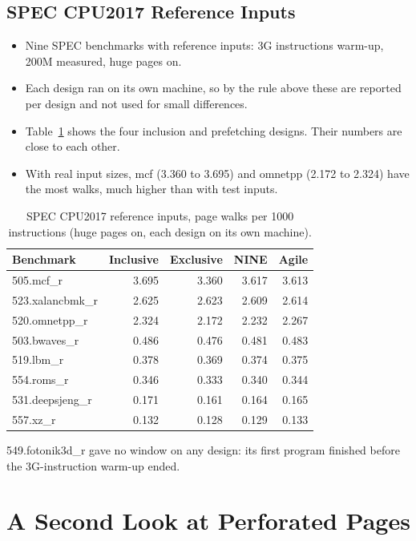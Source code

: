 \subsection{SPEC CPU2017 Reference Inputs}
\begin{itemize}
    \item Nine SPEC benchmarks with reference inputs: 3G instructions warm-up, 200M measured, huge pages on.
    \item Each design ran on its own machine, so by the rule above these are reported per design and not used for small differences.
    \item Table~\ref{tab:ref} shows the four inclusion and prefetching designs. Their numbers are close to each other.
    \item With real input sizes, mcf (3.360 to 3.695) and omnetpp (2.172 to 2.324) have the most walks, much higher than with test inputs.
\end{itemize}

\begin{table}[H]
\centering
\small
\caption{SPEC CPU2017 reference inputs, page walks per 1000 instructions (huge pages on, each design on its own machine).}
\label{tab:ref}
\begin{tabular}{l r r r r}
\toprule
\textbf{Benchmark} & \textbf{Inclusive} & \textbf{Exclusive} & \textbf{NINE} & \textbf{Agile} \\
\midrule
505.mcf\_r & 3.695 & 3.360 & 3.617 & 3.613 \\
523.xalancbmk\_r & 2.625 & 2.623 & 2.609 & 2.614 \\
520.omnetpp\_r & 2.324 & 2.172 & 2.232 & 2.267 \\
503.bwaves\_r & 0.486 & 0.476 & 0.481 & 0.483 \\
519.lbm\_r & 0.378 & 0.369 & 0.374 & 0.375 \\
554.roms\_r & 0.346 & 0.333 & 0.340 & 0.344 \\
531.deepsjeng\_r & 0.171 & 0.161 & 0.164 & 0.165 \\
557.xz\_r & 0.132 & 0.128 & 0.129 & 0.133 \\
\bottomrule
\end{tabular}
\end{table}

\noindent 549.fotonik3d\_r gave no window on any design: its first program finished before the 3G-instruction warm-up ended.

\section{A Second Look at Perforated Pages}
\label{sec:perf_strict}

